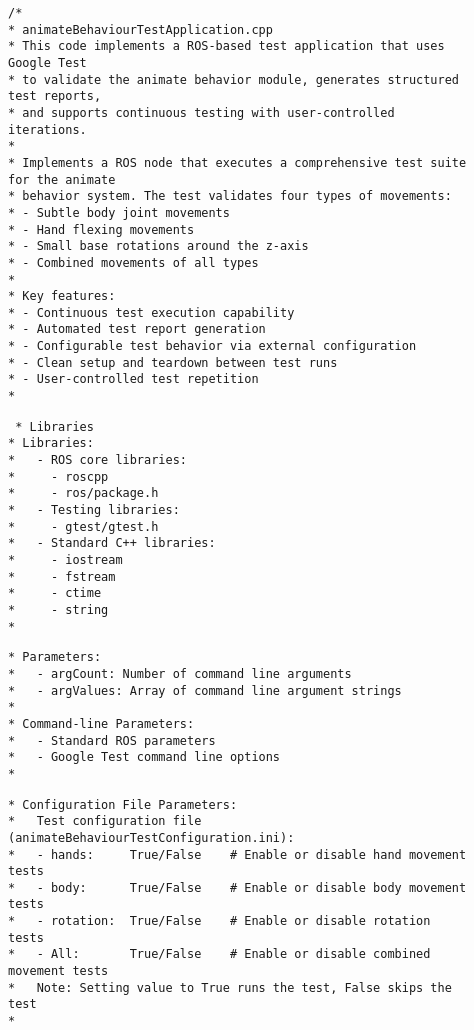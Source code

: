 \documentclass{CSSRforAfrica}
\newcommand{\checkboxChecked}{\fbox{\ding{51}}} %
\begin{document}
\begin{description}

\item[\checkboxChecked] 
 {\small 
\begin{verbatim}
/*
* animateBehaviourTestApplication.cpp
* This code implements a ROS-based test application that uses Google Test
* to validate the animate behavior module, generates structured test reports, 
* and supports continuous testing with user-controlled iterations.
* 
* Implements a ROS node that executes a comprehensive test suite for the animate
* behavior system. The test validates four types of movements:
* - Subtle body joint movements
* - Hand flexing movements
* - Small base rotations around the z-axis
* - Combined movements of all types
* 
* Key features:
* - Continuous test execution capability
* - Automated test report generation
* - Configurable test behavior via external configuration
* - Clean setup and teardown between test runs
* - User-controlled test repetition
*
\end{verbatim}}

\item[\checkboxChecked] 
 {\small 
\begin{verbatim}
 * Libraries
* Libraries:
*   - ROS core libraries:
*     - roscpp
*     - ros/package.h
*   - Testing libraries:
*     - gtest/gtest.h
*   - Standard C++ libraries:
*     - iostream
*     - fstream
*     - ctime
*     - string
* 
\end{verbatim}}

\item[\checkboxChecked] 
 {\small 
\begin{verbatim}
* Parameters:
*   - argCount: Number of command line arguments
*   - argValues: Array of command line argument strings
* 
* Command-line Parameters:
*   - Standard ROS parameters
*   - Google Test command line options
* 
\end{verbatim}}

\newpage
\item[\checkboxChecked] 
 {\small 
\begin{verbatim}
* Configuration File Parameters:
*   Test configuration file (animateBehaviourTestConfiguration.ini):
*   - hands:     True/False    # Enable or disable hand movement tests
*   - body:      True/False    # Enable or disable body movement tests
*   - rotation:  True/False    # Enable or disable rotation tests
*   - All:       True/False    # Enable or disable combined movement tests
*   Note: Setting value to True runs the test, False skips the test
* 
\end{verbatim}}


\end{description}
\end{document}
